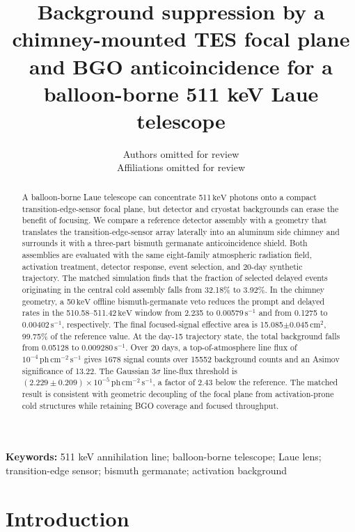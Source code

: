\documentclass[11pt]{article}
\title{\textbf{Background suppression by a chimney-mounted TES focal plane and BGO anticoincidence for a balloon-borne 511 keV Laue telescope}}
\author{Authors omitted for review\\[0.25em]\small Affiliations omitted for review}
\date{}
\newcommand{\keV}{\ensuremath{\,\mathrm{keV}}\xspace}
\newcommand{\cps}{\ensuremath{\,\mathrm{s^{-1}}}\xspace}
\newcommand{\phflux}{\ensuremath{\,\mathrm{ph\,cm^{-2}\,s^{-1}}}\xspace}
\begin{document}
\maketitle
\linenumbers

\begin{abstract}
A balloon-borne Laue telescope can concentrate 511\keV photons onto a compact
transition-edge-sensor focal plane, but detector and cryostat backgrounds can
erase the benefit of focusing. We compare a reference detector assembly with a
geometry that translates the transition-edge-sensor array laterally into an
aluminum side chimney and surrounds it with a three-part bismuth germanate
anticoincidence shield. Both assemblies are evaluated with the same
eight-family atmospheric radiation field, activation treatment, detector
response, event selection, and 20-day synthetic trajectory. The matched
simulation finds that the fraction of selected delayed events originating in
the central cold assembly falls from 32.18\% to 3.92\%. In the
chimney geometry, a 50\keV offline bismuth-germanate veto reduces the prompt and
delayed rates in the 510.58--511.42\keV window from 2.235 to 0.00579\cps and
from 0.1275 to 0.00402\cps, respectively. The final focused-signal effective
area is 15.085$\pm$0.045\,cm$^2$, 99.75\% of the reference value. At the
day-15 trajectory state, the total background falls from 0.05128 to
0.009280\cps. Over 20 days, a top-of-atmosphere line flux of
$10^{-4}\phflux$ gives 1678 signal
counts over 15552 background counts and an Asimov significance of 13.22. The
Gaussian 3$\sigma$ line-flux threshold is
$(2.229\pm0.209)\times10^{-5}\phflux$, a factor of 2.43 below the reference.
The matched result is consistent with geometric decoupling of the focal plane
from activation-prone cold structures while retaining BGO coverage and focused
throughput.
\end{abstract}

\noindent\textbf{Keywords:} 511 keV annihilation line; balloon-borne telescope;
Laue lens; transition-edge sensor; bismuth germanate; activation background

\section{Introduction}
\label{sec:introduction}
\end{document}
